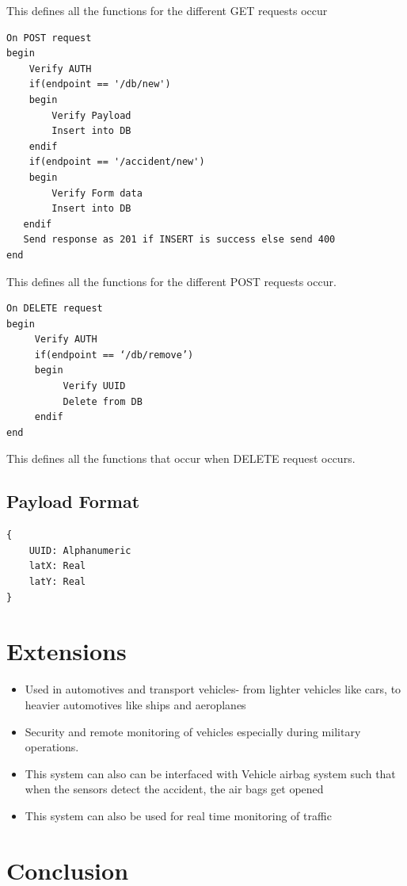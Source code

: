 \documentclass{llncs}
\begin{document}
This defines all the functions for the different GET requests occur

\begin{verbatim}
On POST request
begin
    Verify AUTH
    if(endpoint == '/db/new')
    begin
        Verify Payload
        Insert into DB
	endif
	if(endpoint == '/accident/new')
	begin
		Verify Form data
		Insert into DB
   endif
   Send response as 201 if INSERT is success else send 400
end	
\end{verbatim}

This defines all the functions for the different POST requests occur.

\begin{verbatim}
On DELETE request
begin
     Verify AUTH
     if(endpoint == ‘/db/remove’)
     begin
          Verify UUID
          Delete from DB
     endif
end
\end{verbatim}

This defines all the functions that occur when DELETE request occurs.

\subsection{Payload Format}
\label{sub:payload}
\begin{verbatim}
{
    UUID: Alphanumeric
    latX: Real
    latY: Real
}
\end{verbatim}

\section{Extensions}
\begin{itemize}
	\item  Used in automotives and transport vehicles- from lighter vehicles like cars, to heavier automotives like ships and aeroplanes
	\item Security and remote monitoring of vehicles especially during military operations. 
	\item This system can also can be interfaced with Vehicle airbag system such that when the sensors detect the accident, the air bags get opened
	\item  This system can also be used for real time monitoring of traffic
\end{itemize}

\section{Conclusion}
\end{document}
